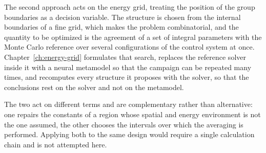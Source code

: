 The second approach acts on the energy grid, treating the position of the group
boundaries as a decision variable. The structure is chosen from the internal
boundaries of a fine grid, which makes the problem combinatorial, and the
quantity to be optimized is the agreement of a set of integral parameters with
the Monte Carlo reference over several configurations of the control system at
once. Chapter~\ref{ch:energy-grid} formulates that search, replaces the reference
solver inside it with a neural metamodel so that the campaign can be repeated
many times, and recomputes every structure it proposes with the solver, so that
the conclusions rest on the solver and not on the metamodel.

The two act on different terms and are complementary rather than alternative:
one repairs the constants of a region whose spatial and energy environment is not
the one assumed, the other chooses the intervals over which the averaging is
performed. Applying both to the same design would require a single calculation
chain and is not attempted here.
